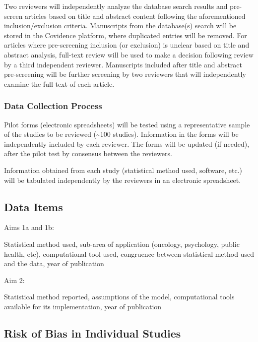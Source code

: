 \documentclass[
]{article}
\begin{document}
Two reviewers will independently analyze the database search results and
pre-screen articles based on title and abstract content following the
aforementioned inclusion/exclusion criteria. Manuscripts from the
database(s) search will be stored in the Covidence platform, where
duplicated entries will be removed. For articles where pre-screening
inclusion (or exclusion) is unclear based on title and abstract
analysis, full-text review will be used to make a decision following
review by a third independent reviewer. Manuscripts included after title
and abstract pre-screening will be further screening by two reviewers
that will independently examine the full text of each article.

\hypertarget{data-collection-process}{%
\subsubsection{Data Collection Process}\label{data-collection-process}}

Pilot forms (electronic spreadsheets) will be tested using a
representative sample of the studies to be reviewed (\textasciitilde100
studies). Information in the forms will be independently included by
each reviewer. The forms will be updated (if needed), after the pilot
test by consensus between the reviewers.

Information obtained from each study (statistical method used, software,
etc.) will be tabulated independently by the reviewers in an electronic
spreadsheet.

\hypertarget{data-items}{%
\subsection{Data Items}\label{data-items}}

Aims 1a and 1b:

Statistical method used, sub-area of application (oncology, psychology,
public health, etc), computational tool used, congruence between
statistical method used and the data, year of publication

Aim 2:

Statistical method reported, assumptions of the model, computational
tools available for its implementation, year of publication

\hypertarget{risk-of-bias-in-individual-studies}{%
\subsection{Risk of Bias in Individual
Studies}\label{risk-of-bias-in-individual-studies}}
\end{document}
